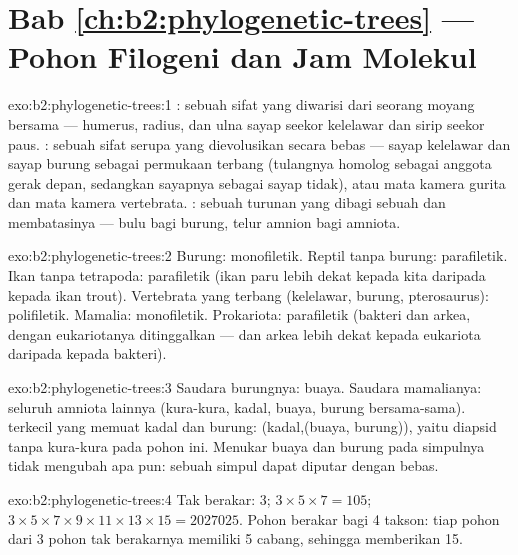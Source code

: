 \section*{Bab \ref{ch:b2:phylogenetic-trees} --- Pohon Filogeni dan Jam Molekul}

\begin{solution}{exo:b2:phylogenetic-trees:1}
: sebuah sifat yang diwarisi dari seorang moyang bersama ---
humerus, radius, dan ulna sayap seekor kelelawar dan sirip seekor paus.
: sebuah sifat serupa yang dievolusikan secara bebas --- sayap
kelelawar dan sayap burung sebagai permukaan terbang (tulangnya homolog
sebagai anggota gerak depan, sedangkan sayapnya sebagai sayap tidak),
atau mata kamera gurita dan mata kamera vertebrata. : sebuah
 turunan yang dibagi sebuah  dan membatasinya --- bulu bagi
burung, telur amnion bagi amniota.
\end{solution}

\begin{solution}{exo:b2:phylogenetic-trees:2}
Burung: monofiletik. Reptil tanpa burung: parafiletik. Ikan tanpa
tetrapoda: parafiletik (ikan paru lebih dekat kepada kita daripada
kepada ikan trout). Vertebrata yang terbang (kelelawar, burung,
pterosaurus): polifiletik. Mamalia: monofiletik. Prokariota:
parafiletik (bakteri dan arkea, dengan eukariotanya ditinggalkan ---
dan arkea lebih dekat kepada eukariota daripada kepada bakteri).
\end{solution}

\begin{solution}{exo:b2:phylogenetic-trees:3}
Saudara burungnya: buaya. Saudara mamalianya: seluruh amniota lainnya
(kura-kura, kadal, buaya, burung bersama-sama).  terkecil yang
memuat kadal dan burung: (kadal,(buaya, burung)), yaitu diapsid tanpa
kura-kura pada pohon ini. Menukar buaya dan burung pada simpulnya tidak
mengubah apa pun: sebuah simpul dapat diputar dengan bebas.
\end{solution}

\begin{solution}{exo:b2:phylogenetic-trees:4}
Tak berakar: $3$; $3\times 5\times 7 = 105$; $3\times 5\times
7\times 9\times 11\times 13\times 15 = \num{2027025}$. Pohon berakar
bagi 4 takson: tiap pohon dari 3 pohon tak berakarnya memiliki 5
cabang, sehingga memberikan 15.
\end{solution}

